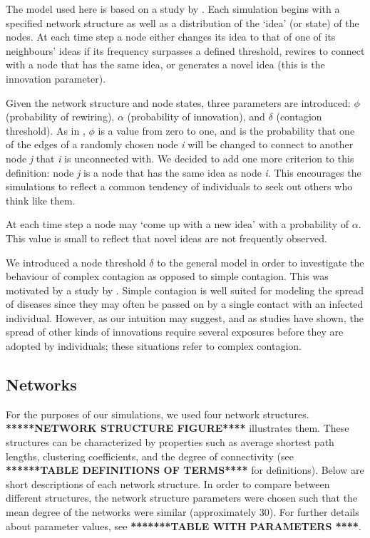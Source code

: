 

The model used here is based on a study by \citet*{HN2006}.  Each simulation begins with a specified network structure as well as a distribution of the `idea' (or state) of the nodes. At each time step a node either changes its idea to that of one of its neighbours' ideas if its frequency surpasses a defined threshold, rewires to connect with a node that has the same idea, or generates a novel idea (this is the innovation parameter). 


Given the network structure and node states, three parameters are introduced: $\phi$ (probability of rewiring), $\alpha$ (probability of innovation), and $\delta$ (contagion threshold). As in \citet*{HN2006}, $\phi$ is a value from zero to one, and is the probability that one of the edges of a randomly chosen node \emph{i} will be changed to connect to another node \emph{j} that \emph{i} is unconnected with. We decided to add one more criterion to this definition: node \emph{j} is a node that has the same idea as node \emph{i}. This encourages the simulations to reflect a common tendency of individuals to seek out others who think like them.


At each time step a node may `come up with a new idea' with a probability of $\alpha$. This value is small to reflect that novel ideas are not frequently observed.


We introduced a node threshold $\delta$ to the general model in order to investigate the behaviour of complex contagion as opposed to simple contagion. This was motivated by a study by \citet*{CM2007}. Simple contagion is well suited for modeling the spread of diseases since they may often be passed on by a single contact with an infected individual. However, as our intuition may suggest, and as studies have shown, the spread of other kinds of innovations require several exposures before they are adopted by individuals; these situations refer to complex contagion.


\subsection{Networks}

For the purposes of our simulations, we used four network structures. \textbf{*****NETWORK STRUCTURE FIGURE****} illustrates them. These structures can be characterized by properties such as average shortest path lengths, clustering coefficients, and the degree of connectivity (see \textbf{******TABLE DEFINITIONS OF TERMS****} for definitions). Below are short descriptions of each network structure. In order to compare between different structures, the network structure parameters were chosen such that the mean degree of the networks were similar (approximately 30). For further details about parameter values, see \textbf{*******TABLE WITH PARAMETERS ****}.

